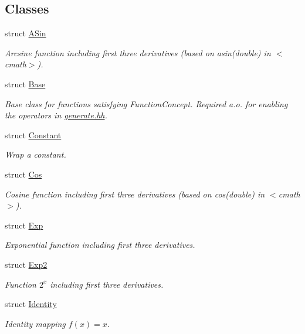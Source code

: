 \subsection*{Classes}
\begin{DoxyCompactItemize}
\item 
struct \hyperlink{structFunG_1_1ASin}{A\+Sin}
\begin{DoxyCompactList}\small\item\em Arcsine function including first three derivatives (based on asin(double) in $<$cmath$>$). \end{DoxyCompactList}\item 
struct \hyperlink{structFunG_1_1Base}{Base}
\begin{DoxyCompactList}\small\item\em Base class for functions satisfying Function\+Concept. Required a.\+o. for enabling the operators in \hyperlink{generate_8hh}{generate.\+hh}. \end{DoxyCompactList}\item 
struct \hyperlink{structFunG_1_1Constant}{Constant}
\begin{DoxyCompactList}\small\item\em Wrap a constant. \end{DoxyCompactList}\item 
struct \hyperlink{structFunG_1_1Cos}{Cos}
\begin{DoxyCompactList}\small\item\em Cosine function including first three derivatives (based on cos(double) in $<$cmath$>$). \end{DoxyCompactList}\item 
struct \hyperlink{structFunG_1_1Exp}{Exp}
\begin{DoxyCompactList}\small\item\em Exponential function including first three derivatives. \end{DoxyCompactList}\item 
struct \hyperlink{structFunG_1_1Exp2}{Exp2}
\begin{DoxyCompactList}\small\item\em Function $2^x$ including first three derivatives. \end{DoxyCompactList}\item 
struct \hyperlink{structFunG_1_1Identity}{Identity}
\begin{DoxyCompactList}\small\item\em Identity mapping $ f(x)=x $. \end{DoxyCompactList}\item 

\end{DoxyCompactItemize}
